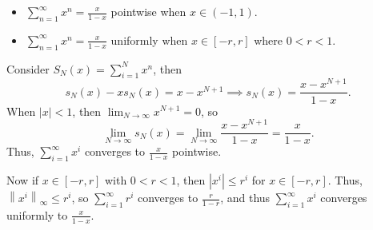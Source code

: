 \begin{eg}
    \vphantom{text}
    \begin{itemize}
        \item \(\sum_{n=1}^{\infty} x^n = \frac{x}{1-x} \) pointwise when \(x \in (-1, 1)\). 
        \item \(\sum_{n=1}^{\infty} x^n = \frac{x}{1-x} \) uniformly when \(x \in [-r, r]\) where \(0 < r < 1\).     
    \end{itemize}
\end{eg}
\begin{explanation}
    Consider \(S_N(x) = \sum_{i=1}^N x^n \), then 
    \[
        s_N(x) - x s_N(x) = x - x^{N+1} \implies s_N(x) = \frac{x - x^{N+1}}{1-x}.
    \] 
    When \(\vert x \vert < 1 \), then \(\lim_{N \to \infty} x^{N+1}  = 0\), so 
    \[
        \lim_{N \to \infty} s_N(x) = \lim_{N \to \infty} \frac{x - x^{N+1}}{1-x} = \frac{x}{1-x}.  
    \] 
    Thus, \(\sum_{i=1}^{\infty} x^i \) converges to \(\frac{x}{1-x}\) pointwise. 
    
    Now if \(x \in [-r, r]\) with \(0 < r < 1\), then \(\left\vert x^i \right\vert \le r^i \) for \(x \in [-r, r]\). Thus, \(\left\lVert x^i \right\rVert _\infty \le r^i \), so \(\sum_{i=1}^{\infty} r^i \) converges to \(\frac{r}{1-r}\), and thus \(\sum_{i=1}^{\infty} x^i \) converges uniformly to \(\frac{x}{1-x}\).        
\end{explanation}